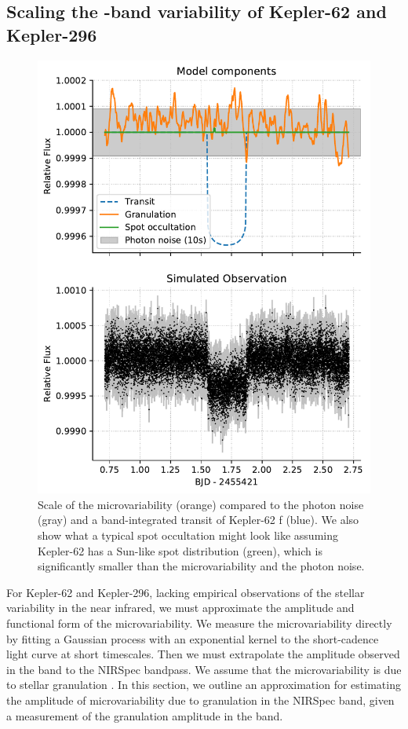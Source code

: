 \subsection{Scaling the \kepler-band variability of Kepler-62 and Kepler-296}

\begin{figure}
\centering
\includegraphics[scale=0.6]{libra/k62f_breakdown.pdf}
\caption{Scale of the microvariability (orange) compared to the photon noise (gray) and a band-integrated transit of Kepler-62 f (blue). We also show what a typical spot occultation might look like assuming Kepler-62 has a Sun-like spot distribution (green), which is significantly smaller than the microvariability and the photon noise.}
\label{fig:k62f}
\end{figure}

For Kepler-62 and Kepler-296, lacking empirical observations of the stellar variability in the near infrared, we must approximate the amplitude and functional form of the microvariability. We measure the microvariability directly by fitting a Gaussian process with an exponential kernel to the \kepler short-cadence light curve at short timescales. Then we must extrapolate the amplitude observed in the \kepler band to the NIRSpec bandpass. We assume that the microvariability is due to stellar granulation \citep{Ludwig2002, Tremblay2013, Trampedach2017}. In this section, we outline an approximation for estimating the amplitude of microvariability due to granulation in the NIRSpec band, given a measurement of the granulation amplitude in the \kepler band.

